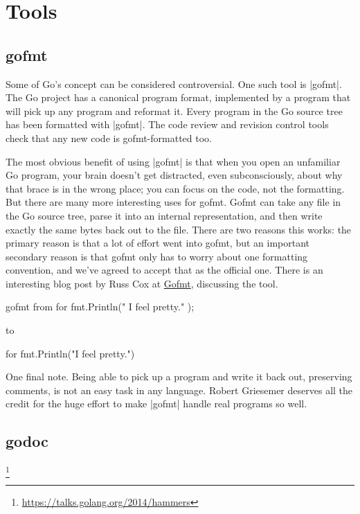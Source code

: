 \chapter{Tools}

\section{gofmt}

Some of Go's concept can be considered controversial. One such tool is |gofmt|. The Go project has 
a canonical program format, implemented by a program that will pick up any program and reformat it.
Every program in the Go source tree has been formatted with |gofmt|. The code review and revision control 
tools check that any new code is gofmt-formatted too. 

The most obvious benefit of using |gofmt| is that when you open an unfamiliar Go program, your brain doesn't get distracted, even subconsciously, about why that brace is in the wrong place; you can focus on the code, not the formatting. But there are many more interesting uses for gofmt. Gofmt can take any file in the Go source tree, parse it into an internal representation, and then write exactly the same bytes back out to the file. There are two reasons this works: the primary reason is that a lot of effort went into gofmt, but an important secondary reason is that gofmt only has to worry about one formatting convention, and we've agreed to accept that as the official one. There is an interesting blog post by Russ Cox at \href{http://research.swtch.com/gofmt}{Gofmt}, 
discussing the tool.

\begin{teX}
gofmt
from
for{
fmt.Println("    I feel pretty." );
       }
\end{teX}
       
to

\begin{teX}
for {
    fmt.Println("I feel pretty.")
}
\end{teX}

One final note. Being able to pick up a program and write it back out, preserving comments, is not an easy task in any language. Robert Griesemer deserves all the credit for the huge effort to make |gofmt| handle real programs so well.

\section{godoc}


\footnote{\protect\url{https://talks.golang.org/2014/hammers}}


